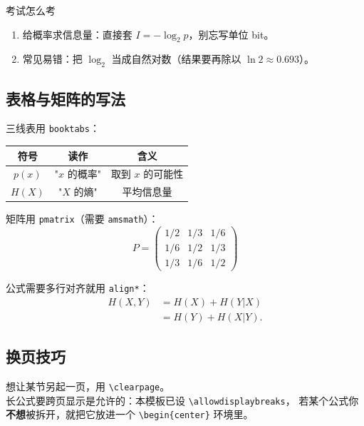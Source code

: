 \documentclass[11pt,a4paper,fontset=fandol]{ctexart}
\newcommand{\Hx}[1]{H\!\left(#1\right)}       %
\newcommand{\lb}{\log_{2}}                    %
\begin{document}
\begin{exam}{考试怎么考}
\begin{enumerate}[leftmargin=1.6em,itemsep=1pt,topsep=2pt]
  \item 给概率求信息量：直接套 $I=-\lb p$，别忘写单位 bit。
  \item 常见易错：把 $\lb$ 当成自然对数（结果要再除以 $\ln2\approx0.693$）。
\end{enumerate}
\end{exam}

\subsection{表格与矩阵的写法}

三线表用 \texttt{booktabs}：
\begin{center}
\renewcommand{\arraystretch}{1.25}
\begin{tabular}{c|c|c}
\toprule
符号 & 读作 & 含义\\
\midrule
$p(x)$ & "$x$ 的概率" & 取到 $x$ 的可能性\\
$\Hx{X}$ & "$X$ 的熵" & 平均信息量\\
\bottomrule
\end{tabular}
\end{center}

矩阵用 \texttt{pmatrix}（需要 \texttt{amsmath}）：
\[
P=\begin{pmatrix}1/2 & 1/3 & 1/6\\ 1/6 & 1/2 & 1/3\\ 1/3 & 1/6 & 1/2\end{pmatrix}
\]

公式需要多行对齐就用 \texttt{align*}：
\begin{align*}
\Hx{X,Y}&=\Hx{X}+\Hx{Y|X}\\
&=\Hx{Y}+\Hx{X|Y}.
\end{align*}

\subsection{换页技巧}

想让某节另起一页，用 \verb|\clearpage|。\\
长公式要跨页显示是允许的：本模板已设 \verb|\allowdisplaybreaks|，
若某个公式你\textbf{不想}被拆开，就把它放进一个 \verb|\begin{center}| 环境里。
\end{document}

